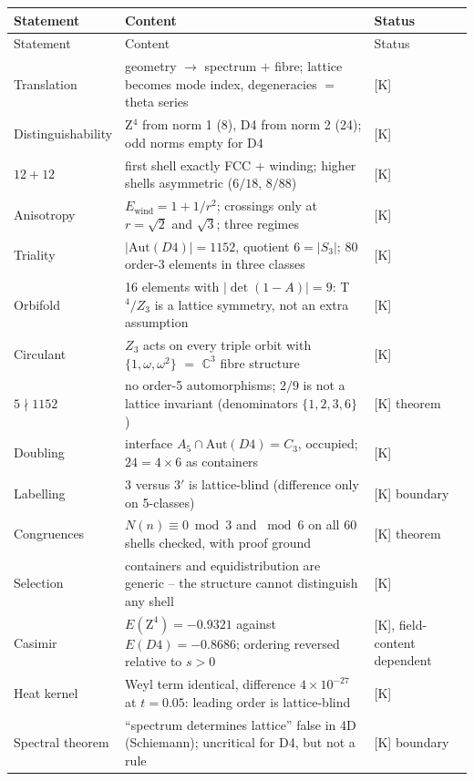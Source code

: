 \documentclass[11pt]{report}
\begin{document}
{\small
\begin{longtable}{lp{6.4cm}l}
\toprule
Statement & Content & Status \\
\midrule
\endfirsthead
\toprule
Statement & Content & Status \\
\midrule
\endhead
\bottomrule
\endfoot
Translation & geometry $\to$ spectrum $+$ fibre; lattice becomes
  mode index, degeneracies $=$ theta series & [K] \\
Distinguishability & Z$^4$ from norm 1 (8), D4 from norm 2 (24);
  odd norms empty for D4 & [K] \\
$12+12$ & first shell exactly FCC $+$ winding; higher shells
  asymmetric ($6/18$, $8/88$) & [K] \\
Anisotropy & $E_\text{wind} = 1 + 1/r^2$; crossings only at
  $r = \sqrt2$ and $\sqrt3$; three regimes & [K] \\
Triality & $|\text{Aut}(D4)| = 1152$, quotient $6 = |S_3|$;
  80 order-3 elements in three classes & [K] \\
Orbifold & 16 elements with $|\det(1-A)| = 9$: T$^4/Z_3$ is a
  lattice symmetry, not an extra assumption & [K] \\
Circulant & $Z_3$ acts on every triple orbit with
  $\{1,\omega,\omega^2\}$ $=$ $\mathbb{C}^3$ fibre structure & [K] \\
$5 \nmid 1152$ & no order-5 automorphisms; $2/9$ is not a lattice
  invariant (denominators $\{1,2,3,6\}$) & [K] theorem \\
Doubling & interface $A_5 \cap \text{Aut}(D4) = C_3$, occupied;
  $24 = 4\times6$ as containers & [K] \\
Labelling & $3$ versus $3'$ is lattice-blind (difference only on
  5-classes) & [K] boundary \\
Congruences & $N(n) \equiv 0 \bmod 3$ and $\bmod 6$ on all 60
  shells checked, with proof ground & [K] theorem \\
Selection & containers and equidistribution are generic --
  the structure cannot distinguish any shell & [K] \\
Casimir & $E(\text{Z}^4) = -0.9321$ against
  $E(D4) = -0.8686$; ordering reversed relative to $s>0$
  & [K], field-content dependent \\
Heat kernel & Weyl term identical, difference $4\times10^{-27}$ at
  $t = 0.05$: leading order is lattice-blind & [K] \\
Spectral theorem & \enquote{spectrum determines lattice} false in 4D
  (Schiemann); uncritical for D4, but not a rule & [K] boundary \\

\end{longtable}}
\end{document}
